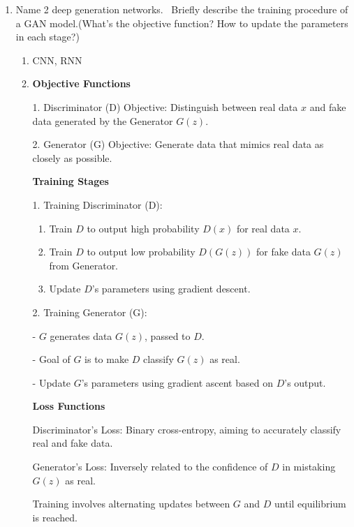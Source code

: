 \documentclass[10pt]{article}
\begin{document}
\begin{enumerate}[1.]
		\newpage


	\item {} Name 2 deep generation networks.~ Briefly describe the training procedure of a GAN model.(What's the objective function? How to update the parameters in each stage?)~\\
	\begin{enumerate}
		\item 
		CNN, RNN
		\item 
\textbf{Objective Functions}

1. Discriminator (D) Objective: Distinguish between real data \( x \) and fake data generated by the Generator \( G(z) \).

2. Generator (G) Objective: Generate data that mimics real data as closely as possible.

\textbf{Training Stages}

1. Training Discriminator (D):
\begin{enumerate}[-]
	\item Train \( D \) to output high probability \( D(x) \) for real data \( x \).
	\item Train \( D \) to output low probability \( D(G(z)) \) for fake data \( G(z) \) from Generator.
	\item Update \( D \)'s parameters using gradient descent.
\end{enumerate}
2. Training Generator (G):

   - \( G \) generates data \( G(z) \), passed to \( D \).

   - Goal of \( G \) is to make \( D \) classify \( G(z) \) as real.

   - Update \( G \)'s parameters using gradient ascent based on \( D \)'s output.

\textbf{Loss Functions}

Discriminator's Loss: Binary cross-entropy, aiming to accurately classify real and fake data.

Generator's Loss: Inversely related to the confidence of \( D \) in mistaking \( G(z) \) as real.

Training involves alternating updates between \( G \) and \( D \) until equilibrium is reached.
	\end{enumerate}

\end{enumerate}
\end{document}
